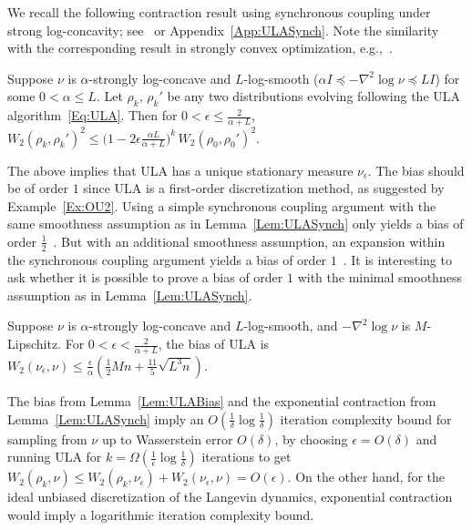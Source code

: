\documentclass[final,12pt]{colt2018}
\begin{document}
We recall the following contraction result using synchronous coupling under strong log-concavity; see~\cite[Lemma~1]{D17a} or Appendix~\ref{App:ULASynch}.
Note the similarity with the corresponding result in strongly convex optimization, e.g.,~\cite[Theorem~2.1.15]{Nesterov04}.

\begin{lemma}\label{Lem:ULASynch}
Suppose $\nu$ is $\alpha$-strongly log-concave and $L$-log-smooth ($\alpha I \preceq -\nabla^2 \log \nu \preceq LI$) for some $0 < \alpha \le L$.
Let $\rho_k$, $\rho_k'$ be any two distributions evolving following the ULA algorithm~\eqref{Eq:ULA}.
Then for $0 < \epsilon \le \frac{2}{\alpha+L}$,
$W_2(\rho_k,\rho_k')^2 \le \big(1-2\epsilon\frac{\alpha L}{\alpha+L}\big)^k \, W_2(\rho_0,\rho_0')^2.$
\end{lemma}

The above implies that ULA has a unique stationary measure $\nu_\epsilon$.
The bias should be of order $1$
since ULA is a first-order discretization method, as suggested by Example~\ref{Ex:OU2}.
Using a simple synchronous coupling argument with the same smoothness assumption as in Lemma~\ref{Lem:ULASynch} only yields a bias of order $\frac{1}{2}$~\citep[Theorem~1]{D17a}.
But with an additional smoothness assumption, an expansion within the synchronous coupling argument yields a bias of order $1$~\citep[Theorem~4]{DK17}. 
It is interesting to ask whether it is possible to prove a bias of order $1$ with the minimal smoothness assumption as in Lemma~\ref{Lem:ULASynch}.

\begin{lemma}\label{Lem:ULABias}
Suppose $\nu$ is $\alpha$-strongly log-concave and $L$-log-smooth, and $-\nabla^2 \log \nu$ is $M$-Lipschitz.
For $0 < \epsilon < \frac{2}{\alpha+L}$, the bias of ULA is $W_2(\nu_\epsilon,\nu) \le \frac{\epsilon}{\alpha}(\frac{1}{2} Mn + \frac{11}{5} \sqrt{L^3 n})$.
\end{lemma}

The bias from Lemma~\ref{Lem:ULABias} and the exponential contraction from Lemma~\ref{Lem:ULASynch} imply an $O(\frac{1}{\delta} \log \frac{1}{\delta})$ iteration complexity bound for sampling from $\nu$ up to Wasserstein error $O(\delta)$, 
by choosing $\epsilon = O(\delta)$ and running ULA for $k = \Omega(\frac{1}{\epsilon} \log \frac{1}{\delta})$ iterations to get $W_2(\rho_k,\nu) \le W_2(\rho_k,\nu_\epsilon) + W_2(\nu_\epsilon,\nu) = O(\epsilon)$.
On the other hand, for the ideal unbiased discretization of the Langevin dynamics, exponential contraction would imply a logarithmic iteration complexity bound.
\end{document}
